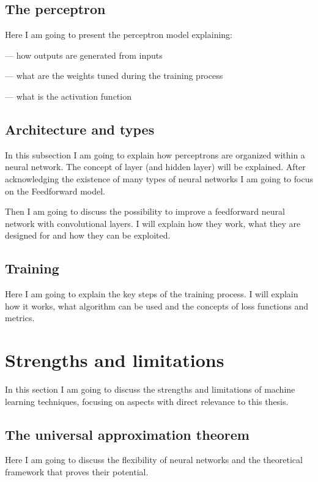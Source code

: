 \documentclass[a4paper,10pt]{report}
\begin{document}
\subsection{The perceptron}

Here I am going to present the perceptron model explaining:

— how outputs are generated from inputs

— what are the weights tuned during the training process

— what is the activation function

\subsection{Architecture and types}

In this subsection I am going to explain how perceptrons are organized 
within a neural network. The concept of layer (and hidden layer) will be explained.
After acknowledging the existence of many types of neural networks
I am going to focus on the Feedforward model.

Then I am going to discuss the possibility to improve a 
feedforward neural network with convolutional layers.
I will explain how they work, what they are designed for and how they can be exploited.

\subsection{Training}

Here I am going to explain the key steps of the training process.
I will explain how it works, what algorithm can be used and the concepts
of loss functions and metrics.

\section{Strengths and limitations}

In this section I am going to discuss the strengths and limitations 
of machine learning techniques, focusing on aspects with direct relevance
to this thesis.

\subsection{The universal approximation theorem}

Here I am going to discuss the flexibility of neural networks and the
theoretical framework that proves their potential.
\end{document}
